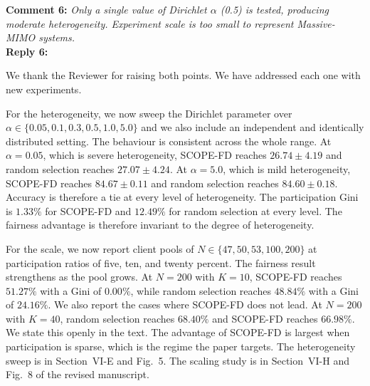 \documentclass[10pt]{article}
\begin{document}
\noindent
\textbf{Comment 6:} \textit{Only a single value of Dirichlet $\alpha$ (0.5) is tested, producing moderate heterogeneity. Experiment scale is too small to represent Massive-MIMO systems.} \\
\noindent
\textbf{Reply 6:} {We thank the Reviewer for raising both points. We have addressed each one with new experiments.

For the heterogeneity, we now sweep the Dirichlet parameter over $\alpha \in \{0.05, 0.1, 0.3, 0.5, 1.0, 5.0\}$ and we also include an independent and identically distributed setting. The behaviour is consistent across the whole range. At $\alpha = 0.05$, which is severe heterogeneity, SCOPE-FD reaches $26.74 \pm 4.19$ and random selection reaches $27.07 \pm 4.24$. At $\alpha = 5.0$, which is mild heterogeneity, SCOPE-FD reaches $84.67 \pm 0.11$ and random selection reaches $84.60 \pm 0.18$. Accuracy is therefore a tie at every level of heterogeneity. The participation Gini is $1.33\%$ for SCOPE-FD and $12.49\%$ for random selection at every level. The fairness advantage is therefore invariant to the degree of heterogeneity.

For the scale, we now report client pools of $N \in \{47, 50, 53, 100, 200\}$ at participation ratios of five, ten, and twenty percent. The fairness result strengthens as the pool grows. At $N = 200$ with $K = 10$, SCOPE-FD reaches $51.27\%$ with a Gini of $0.00\%$, while random selection reaches $48.84\%$ with a Gini of $24.16\%$. We also report the cases where SCOPE-FD does not lead. At $N = 200$ with $K = 40$, random selection reaches $68.40\%$ and SCOPE-FD reaches $66.98\%$. We state this openly in the text. The advantage of SCOPE-FD is largest when participation is sparse, which is the regime the paper targets. The heterogeneity sweep is in Section~VI-E and Fig.~5. The scaling study is in Section~VI-H and Fig.~8 of the revised manuscript.}\\

\end{document}
